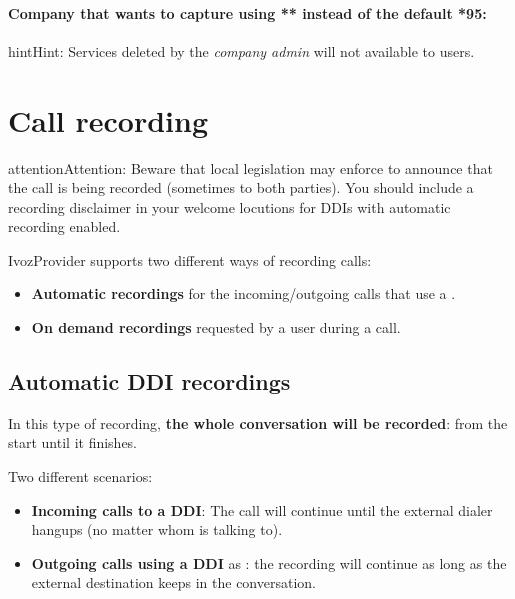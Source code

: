 \documentclass[letterpaper,10pt,english]{sphinxmanual}
\begin{document}
\paragraph{Company that wants to capture using ** instead of the default *95:}

\noindent{}

\begin{notice}{hint}{Hint:}
Services deleted by the \emph{company admin} will not available to users.
\end{notice}


\section{Call recording}
\label{pbx_features/call_recording:call-recording}\label{pbx_features/call_recording::doc}\label{pbx_features/call_recording:call-recordings}
\begin{notice}{attention}{Attention:}
Beware that local legislation may enforce to announce that the
call is being recorded (sometimes to both parties). You should include
a recording disclaimer in your welcome locutions for DDIs with automatic
recording enabled.
\end{notice}

IvozProvider supports two different ways of recording calls:
\begin{itemize}
\item {} 
\textbf{Automatic recordings} for the incoming/outgoing calls that use a
{\hyperref[pbx_features/external_ddis:external\string-ddis]{}}.

\item {} 
\textbf{On demand recordings} requested by a user during a call.

\end{itemize}


\subsection{Automatic DDI recordings}
\label{pbx_features/call_recording:automatic-ddi-recordings}
In this type of recording, \textbf{the whole conversation will be recorded}: from
the start until it finishes.

Two different scenarios:
\begin{itemize}
\item {} 
\textbf{Incoming calls to a DDI}: The call will continue until the external
dialer hangups (no matter whom is talking to).

\item {} 
\textbf{Outgoing calls using a DDI} as {\hyperref[pbx_features/external_ddis:external\string-ddis]{}}: the
recording will continue as long as the external destination keeps in the
conversation.

\end{itemize}
\end{document}
